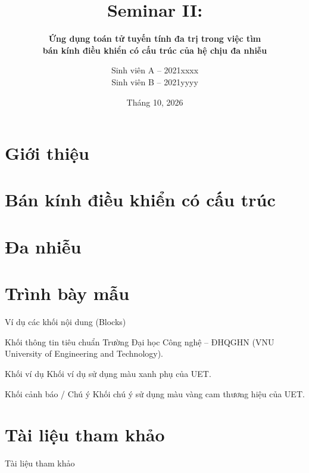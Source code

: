 \documentclass[aspectratio=169]{beamer}
\title{Seminar II:}
\subtitle{\textbf{Ứng dụng toán tử tuyến tính đa trị trong việc tìm\\bán kính điều khiển có cấu trúc của hệ chịu đa nhiễu}}
\author{Sinh viên A -- 2021xxxx\\Sinh viên B -- 2021yyyy}
\date{Tháng 10, 2026}
\begin{document}
\begin{frame}
	\maketitle
\end{frame}

\section{Giới thiệu}


\section{Bán kính điều khiển có cấu trúc}

\section{Đa nhiễu}



\section{Trình bày mẫu}
\begin{frame}{Ví dụ các khối nội dung (Blocks)}
    \begin{block}{Khối thông tin tiêu chuẩn}
        Trường Đại học Công nghệ -- ĐHQGHN (VNU University of Engineering and Technology).
    \end{block}
    \begin{exampleblock}{Khối ví dụ}
        Khối ví dụ sử dụng màu xanh phụ của UET.
    \end{exampleblock}
    \begin{alertblock}{Khối cảnh báo / Chú ý}
        Khối chú ý sử dụng màu vàng cam thương hiệu của UET.
    \end{alertblock}
\end{frame}

\section{Tài liệu tham khảo}
\begin{frame}{Tài liệu tham khảo}
    \nocite{*}
    
    
\end{frame}

\begin{frame}
\end{frame}
\end{document}

